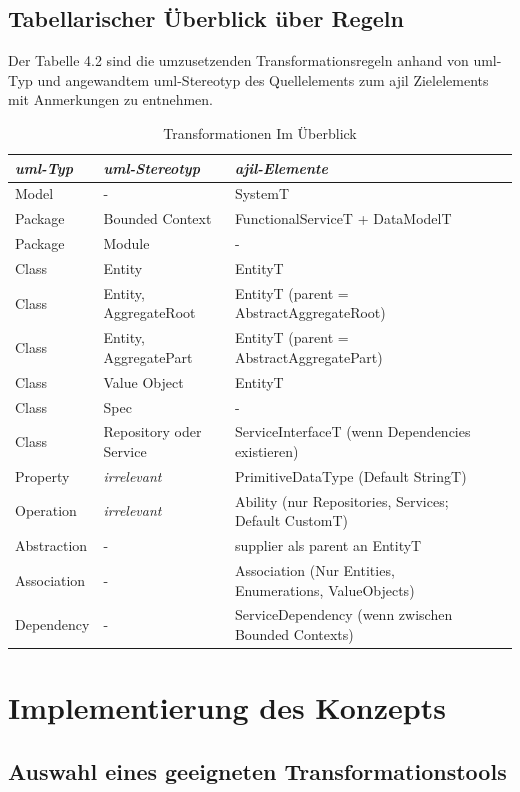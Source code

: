 \documentclass[
	oneside,  %
	ngerman, 
	final, 
	11pt, 
	a4paper, 
	1.1headlines, 
	headinclude=false, 
	footinclude=false, 
	mpinclude=false, 
	pagesize, 
	onecolumn, 
	titlepage, 
	parskip=half, 
	headsepline, 
	chapterprefix=false, 
	version=first, 
	listof=totoc, 
	bibliography=totoc, 
	toc=graduated, 
	fleqn
]{scrbook}
\begin{document}
\section{Tabellarischer Überblick über Regeln}
Der Tabelle 4.2 sind die umzusetzenden Transformationsregeln anhand von \ac{uml}-Typ und angewandtem \ac{uml}-Stereotyp des Quellelements zum \ac{ajil} Zielelements mit Anmerkungen zu entnehmen.
\begin{table}
\begin{tabular}{*5l}   \toprule
\emph{\ac{uml}-Typ} & \emph{\ac{uml}-Stereotyp} & \emph{\ac{ajil}-Elemente}  \\\midrule
 Model    & - & SystemT  \\ 
 Package & Bounded Context & FunctionalServiceT + DataModelT \\
 Package & Module & - \\
 Class & Entity & EntityT \\
 Class & Entity, AggregateRoot & EntityT (parent = AbstractAggregateRoot) \\
 Class & Entity, AggregatePart & EntityT (parent = AbstractAggregatePart) \\
 Class & Value Object & EntityT \\
 Class & Spec & - \\
 Class & Repository oder Service & ServiceInterfaceT (wenn Dependencies existieren) \\
 Property & \textit{irrelevant} & PrimitiveDataType (Default StringT) \\
 Operation & \textit{irrelevant} & Ability (nur Repositories, Services; Default CustomT) \\
 Abstraction & - & supplier als parent an EntityT \\
 Association & - & Association (Nur Entities, Enumerations, ValueObjects) \\
 Dependency & - & ServiceDependency (wenn zwischen Bounded Contexts) \\\bottomrule
 \hline
\end{tabular}
\caption{Transformationen Im Überblick}
\end{table}


\chapter{Implementierung des Konzepts}
\section{Auswahl eines geeigneten Transformationstools}
\end{document}
